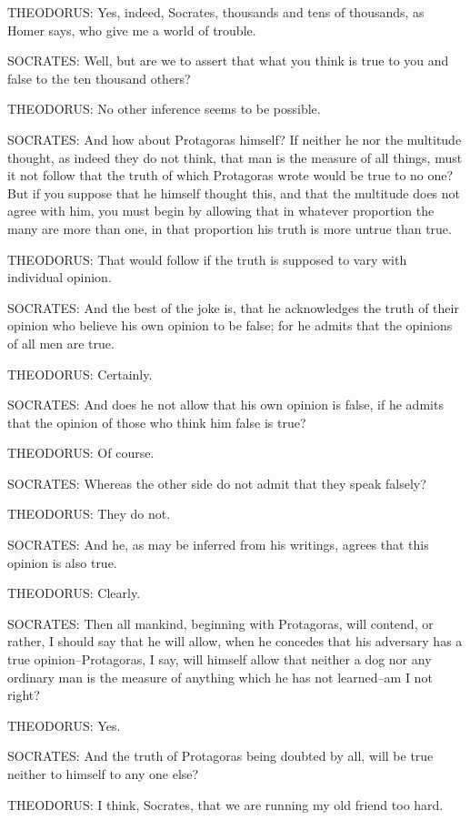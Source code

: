 THEODORUS: Yes, indeed, Socrates, thousands and tens of thousands, as
Homer says, who give me a world of trouble.

SOCRATES: Well, but are we to assert that what you think is true to you
and false to the ten thousand others?

THEODORUS: No other inference seems to be possible.

SOCRATES: And how about Protagoras himself? If neither he nor the
multitude thought, as indeed they do not think, that man is the measure
of all things, must it not follow that the truth of which Protagoras
wrote would be true to no one? But if you suppose that he himself
thought this, and that the multitude does not agree with him, you must
begin by allowing that in whatever proportion the many are more than
one, in that proportion his truth is more untrue than true.

THEODORUS: That would follow if the truth is supposed to vary with
individual opinion.

SOCRATES: And the best of the joke is, that he acknowledges the truth
of their opinion who believe his own opinion to be false; for he admits
that the opinions of all men are true.

THEODORUS: Certainly.

SOCRATES: And does he not allow that his own opinion is false, if he
admits that the opinion of those who think him false is true?

THEODORUS: Of course.

SOCRATES: Whereas the other side do not admit that they speak falsely?

THEODORUS: They do not.

SOCRATES: And he, as may be inferred from his writings, agrees that this
opinion is also true.

THEODORUS: Clearly.

SOCRATES: Then all mankind, beginning with Protagoras, will contend,
or rather, I should say that he will allow, when he concedes that his
adversary has a true opinion--Protagoras, I say, will himself allow that
neither a dog nor any ordinary man is the measure of anything which he
has not learned--am I not right?

THEODORUS: Yes.

SOCRATES: And the truth of Protagoras being doubted by all, will be true
neither to himself to any one else?

THEODORUS: I think, Socrates, that we are running my old friend too
hard.

